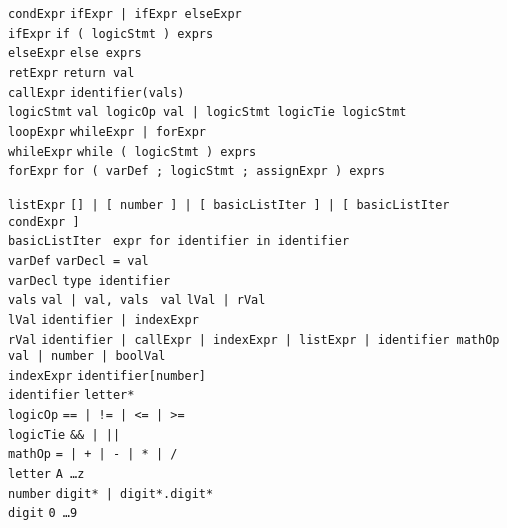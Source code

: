 \documentclass{article}
\newcommand{\keyword}[1]{\colorbox{light-gray}{\texttt{#1}}}
\newcommand{\code}[1]{\texttt{#1}}
\begin{document}
\code{condExpr} \textrightarrow \code{ifExpr | ifExpr elseExpr} \\
\code{ifExpr} \textrightarrow \code{\keyword{if (} logicStmt \keyword{)} exprs } \\
\code{elseExpr} \textrightarrow \code{\keyword{else} exprs} \\
\code{retExpr} \textrightarrow \code{\keyword{return} val} \\
\code{callExpr} \textrightarrow \code{identifier\keyword{(}vals\keyword{)}} \\
\code{logicStmt} \textrightarrow \code{val logicOp val | logicStmt logicTie logicStmt} \\

\code{loopExpr} \textrightarrow \code{whileExpr | forExpr} \\
\code{whileExpr} \textrightarrow \code{\keyword{while (} logicStmt \keyword{)} exprs} \\
\code{forExpr} \textrightarrow \code{\keyword{for (} varDef \keyword{;} logicStmt \keyword{;} assignExpr \keyword{)} exprs}

\code{listExpr} \textrightarrow \code{\keyword{[]} | \keyword{[} number \keyword{]} | \keyword{[} basicListIter \keyword{]} | \keyword{[} basicListIter condExpr \keyword{]} } \\
\code{basicListIter} \textrightarrow \code{ expr \keyword{for} identifier \keyword{in} identifier} \\

\code{varDef} \textrightarrow \code{varDecl \keyword{=} val} \\
\code{varDecl} \textrightarrow \code{type identifier} \\
\code{vals} \textrightarrow \code{val | val, vals }
\code{val} \textrightarrow \code{lVal | rVal} \\
\code{lVal} \textrightarrow \code{identifier | indexExpr} \\
\code{rVal} \textrightarrow \code{identifier | callExpr | indexExpr | listExpr | identifier mathOp val | number | boolVal} \\
\code{indexExpr} \textrightarrow \code{identifier\keyword{[}number\keyword{]}} \\

\code{identifier} \textrightarrow \code{letter*} \\
\code{logicOp} \textrightarrow \code{\keyword{==} | \keyword{!=} | \keyword{<=} | \keyword{>=}} \\
\code{logicTie} \textrightarrow \code{\keyword{\&\&} | \keyword{||}} \\
\code{mathOp} \textrightarrow \code{\keyword{=} | \keyword{+} | \keyword{-} | \keyword{*} | \keyword{/}} \\
\code{letter} \textrightarrow \code{\keyword{A} \ldots \keyword{z}} \\
\code{number} \textrightarrow \code{digit* | digit*.digit*} \\
\code{digit} \textrightarrow \code{\keyword{0} \ldots \keyword{9}} \\
\end{document}
